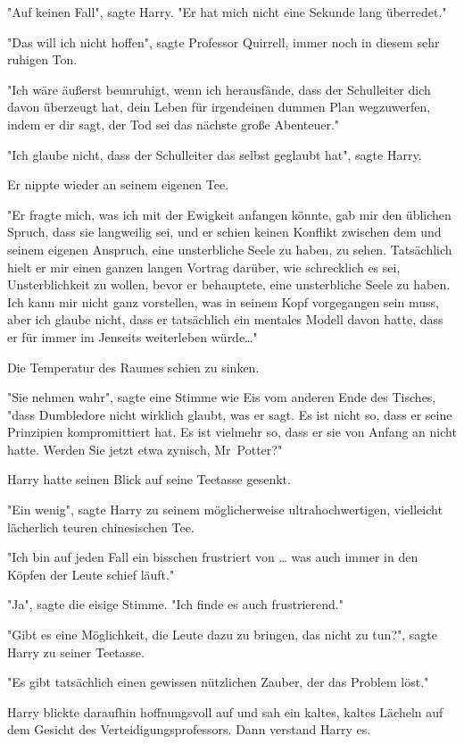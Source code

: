 {"Auf keinen Fall", sagte Harry. "Er hat mich nicht eine Sekunde lang überredet."

"Das will ich nicht hoffen", sagte Professor Quirrell, immer noch in diesem sehr ruhigen Ton.

"Ich wäre äußerst beunruhigt, wenn ich herausfände, dass der Schulleiter dich davon überzeugt hat, dein Leben für irgendeinen dummen Plan wegzuwerfen, indem er dir sagt, der Tod sei das nächste große Abenteuer."

"Ich glaube nicht, dass der Schulleiter das selbst geglaubt hat", sagte Harry.

Er nippte wieder an seinem eigenen Tee.

"Er fragte mich, was ich mit der Ewigkeit anfangen könnte, gab mir den üblichen Spruch, dass sie langweilig sei, und er schien keinen Konflikt zwischen dem und seinem eigenen Anspruch, eine unsterbliche Seele zu haben, zu sehen. Tatsächlich hielt er mir einen ganzen langen Vortrag darüber, wie schrecklich es sei, Unsterblichkeit zu wollen, bevor er behauptete, eine unsterbliche Seele zu haben. Ich kann mir nicht ganz vorstellen, was in seinem Kopf vorgegangen sein muss, aber ich glaube nicht, dass er tatsächlich ein mentales Modell davon hatte, dass er für immer im Jenseits weiterleben würde…"

Die Temperatur des Raumes schien zu sinken.

"Sie nehmen wahr", sagte eine Stimme wie Eis vom anderen Ende des Tisches, "dass Dumbledore nicht wirklich glaubt, was er sagt. Es ist nicht so, dass er seine Prinzipien kompromittiert hat. Es ist vielmehr so, dass er sie von Anfang an nicht hatte. Werden Sie jetzt etwa zynisch, Mr~Potter?"

Harry hatte seinen Blick auf seine Teetasse gesenkt.

"Ein wenig", sagte Harry zu seinem möglicherweise ultrahochwertigen, vielleicht lächerlich teuren chinesischen Tee.

"Ich bin auf jeden Fall ein bisschen frustriert von … was auch immer in den Köpfen der Leute schief läuft."

"Ja", sagte die eisige Stimme. "Ich finde es auch frustrierend."

"Gibt es eine Möglichkeit, die Leute dazu zu bringen, das nicht zu tun?", sagte Harry zu seiner Teetasse.

"Es gibt tatsächlich einen gewissen nützlichen Zauber, der das Problem löst."

Harry blickte daraufhin hoffnungsvoll auf und sah ein kaltes, kaltes Lächeln auf dem Gesicht des Verteidigungsprofessors. Dann verstand Harry es.

}
